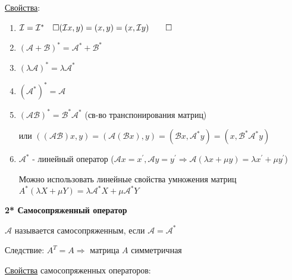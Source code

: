 \documentclass[12pt]{article}
\begin{document}
    \hypertarget{conjugateoperatorproperties}{}

    \underline{Свойства}:

    \begin{enumerate}

        \item $\mathcal{I} = \mathcal{I}^* \quad \Box (\mathcal{I}x, y) = (x, y) = (x, \mathcal{I}y) \qed$

        \item $(\mathcal{A} + \mathcal{B})^* = \mathcal{A}^* + \mathcal{B}^*$

        \item $(\lambda \mathcal{A})^* = \lambda \mathcal{A}^*$

        \item $(\mathcal{A}^*)^* = \mathcal{A}$

        \item $(\mathcal{A}\mathcal{B})^* = \mathcal{B}^* \mathcal{A}^*$ (св-во транспонирования матриц)

        или $((\mathcal{AB})x, y) = (\mathcal{A}(\mathcal{B}x), y) = (\mathcal{B}x, \mathcal{A}^* y) = (x, \mathcal{B}^* \mathcal{A}^* y)$

        \item $\mathcal{A}^*$ - линейный оператор ($\mathcal{A}x = x^\prime, \mathcal{A}y = y^\prime \Longrightarrow \mathcal{A}(\lambda x + \mu y) = \lambda x^\prime + \mu y^\prime$)

        Можно использовать линейные свойства умножения матриц $A^* (\lambda X + \mu Y) = \lambda \mathcal{A}^* X + \mu \mathcal{A}^* Y$
    \end{enumerate}

    \hypertarget{selfconjugateoperator}{}

    \textbf{2* Самосопряженный оператор}

    \Def $\mathcal{A}$ называется самосопряженным, если $\mathcal{A} = \mathcal{A}^*$

    Следствие: $A^T = A \Longrightarrow$ матрица $A$ симметричная

    \hypertarget{selfconjugateoperatorproperties}{}

    \underline{Свойства} самосопряженных операторов:
\end{document}
